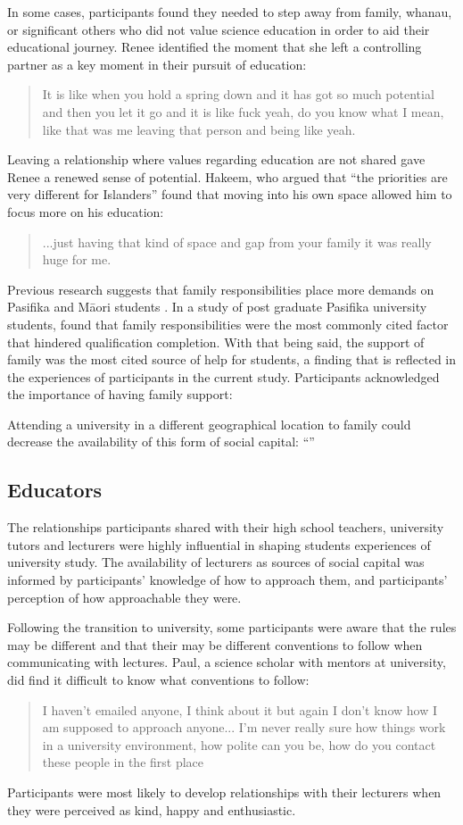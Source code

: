 In some cases, participants found they needed to step away from family, whanau, or significant others who did not value science education in order to aid their educational journey. Renee identified the moment that she left a controlling partner as a key moment in their pursuit of education: \blockquote{It is like when you hold a spring down and it has got so much potential and then you let it go and it is like fuck yeah, do you know what I mean, like that was me leaving that person and being like yeah.}. Leaving a relationship where values regarding education are not shared gave Renee a renewed sense of potential. Hakeem, who argued that ``the priorities are very different for Islanders'' found that moving into his own space allowed him to focus more on his education: \blockquote{...just having that kind of space and gap from your family it was really huge for me.} Previous research suggests that family responsibilities place more demands on Pasifika and M\={a}ori students \citep{zepke2011non}. In a study of post graduate Pasifika university students, \cite{theodore2018pacific} found that family responsibilities were the most commonly cited factor that hindered qualification completion. With that being said, the support of family was the most cited source of help for students, a finding that is reflected in the experiences of participants in the current study. Participants acknowledged the importance of having family support: \blockquote{} Attending a university in a different geographical location to family could decrease the availability of this form of social capital: ``''


\subsection{Educators}
The relationships participants shared with their high school teachers, university tutors and lecturers were highly influential in shaping students experiences of university study. The availability of lecturers as sources of social capital was informed by participants' knowledge of how to approach them, and participants' perception of how approachable they were. 

Following the transition to university, some participants were aware that the rules may be different and that their may be different conventions to follow when communicating with lectures. Paul, a science scholar with mentors at university, did find it difficult to know what conventions to follow:
\blockquote{I haven't emailed anyone, I think about it but again I don’t know how I am supposed to approach anyone... I'm never really sure how things work in a university environment, how polite can you be, how do you contact these people in the first place}. Participants were most likely to develop relationships with their lecturers when they were perceived as kind, happy and enthusiastic. 

